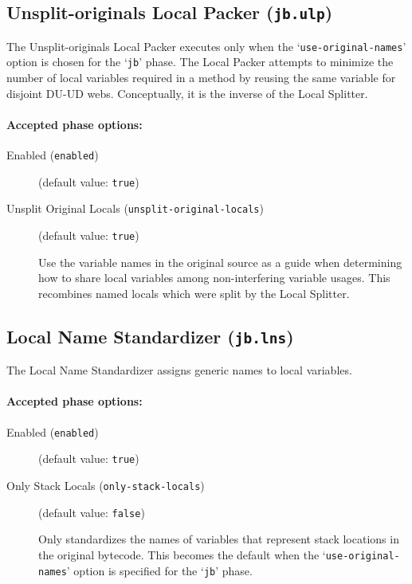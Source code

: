 \documentclass{article}
\begin{document}
\subsection{Unsplit-originals Local Packer ({\tt jb.ulp})}

The Unsplit-originals Local Packer executes only when the
`{\tt use-original-names}' option is chosen for the
`{\tt jb}' phase.  The Local Packer attempts to minimize
the number of local variables required in a method by reusing the
same variable for disjoint DU-UD webs. Conceptually, it is the
inverse of the Local Splitter.


\paragraph{Accepted phase options:} 

\begin{description}

\item[Enabled ({\tt enabled})]
(default value: {\tt true})






\item[Unsplit Original Locals ({\tt unsplit-original-locals})]
(default value: {\tt true})




Use the variable names in the original source as a guide when
determining how to share local variables among non-interfering
variable usages. This recombines named locals which were split by
the Local Splitter.



\end{description}

\subsection{Local Name Standardizer ({\tt jb.lns})}

The Local Name Standardizer assigns generic names to local variables.


\paragraph{Accepted phase options:} 

\begin{description}

\item[Enabled ({\tt enabled})]
(default value: {\tt true})






\item[Only Stack Locals ({\tt only-stack-locals})]
(default value: {\tt false})




Only standardizes the names of variables that represent stack
locations in the original bytecode. This becomes the default when
the `{\tt use-original-names}' option is specified for
the `{\tt jb}' phase.



\end{description}
\end{document}
